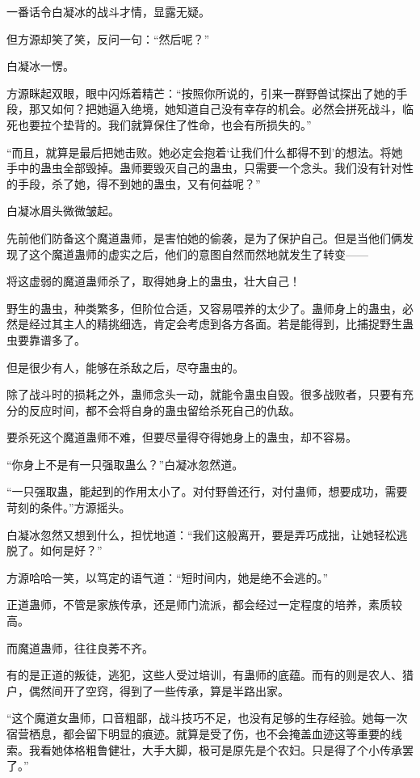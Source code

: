 \begin{this_body}
一番话令白凝冰的战斗才情，显露无疑。

但方源却笑了笑，反问一句：“然后呢？”

白凝冰一愣。

方源眯起双眼，眼中闪烁着精芒：“按照你所说的，引来一群野兽试探出了她的手段，那又如何？把她逼入绝境，她知道自己没有幸存的机会。必然会拼死战斗，临死也要拉个垫背的。我们就算保住了性命，也会有所损失的。”

“而且，就算是最后把她击败。她必定会抱着‘让我们什么都得不到’的想法。将她手中的蛊虫全部毁掉。蛊师要毁灭自己的蛊虫，只需要一个念头。我们没有针对性的手段，杀了她，得不到她的蛊虫，又有何益呢？”

白凝冰眉头微微皱起。

先前他们防备这个魔道蛊师，是害怕她的偷袭，是为了保护自己。但是当他们俩发现了这个魔道蛊师的虚实之后，他们的意图自然而然地就发生了转变——

将这虚弱的魔道蛊师杀了，取得她身上的蛊虫，壮大自己！

野生的蛊虫，种类繁多，但阶位合适，又容易喂养的太少了。蛊师身上的蛊虫，必然是经过其主人的精挑细选，肯定会考虑到各方各面。若是能得到，比捕捉野生蛊虫要靠谱多了。

但是很少有人，能够在杀敌之后，尽夺蛊虫的。

除了战斗时的损耗之外，蛊师念头一动，就能令蛊虫自毁。很多战败者，只要有充分的反应时间，都不会将自身的蛊虫留给杀死自己的仇敌。

要杀死这个魔道蛊师不难，但要尽量得夺得她身上的蛊虫，却不容易。

“你身上不是有一只强取蛊么？”白凝冰忽然道。

“一只强取蛊，能起到的作用太小了。对付野兽还行，对付蛊师，想要成功，需要苛刻的条件。”方源摇头。

白凝冰忽然又想到什么，担忧地道：“我们这般离开，要是弄巧成拙，让她轻松逃脱了。如何是好？”

方源哈哈一笑，以笃定的语气道：“短时间内，她是绝不会逃的。”

正道蛊师，不管是家族传承，还是师门流派，都会经过一定程度的培养，素质较高。

而魔道蛊师，往往良莠不齐。

有的是正道的叛徒，逃犯，这些人受过培训，有蛊师的底蕴。而有的则是农人、猎户，偶然间开了空窍，得到了一些传承，算是半路出家。

“这个魔道女蛊师，口音粗鄙，战斗技巧不足，也没有足够的生存经验。她每一次宿营栖息，都会留下明显的痕迹。就算是受了伤，也不会掩盖血迹这等重要的线索。我看她体格粗鲁健壮，大手大脚，极可是原先是个农妇。只是得了个小传承罢了。”


\end{this_body}
